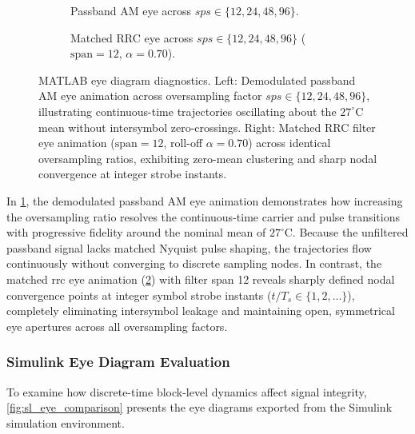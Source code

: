 \documentclass[Markos_Delaportas_1316.tex]{subfiles}
\begin{document}
\begin{figure}[htbp]
    \centering
    \begin{subfigure}{0.48\linewidth}
        \caption{Passband AM eye across $sps \in \{12, 24, 48, 96\}$.}
        \label{fig:ml_awgn_am_fc_eye}
    \end{subfigure}%
    \hfill
    \begin{subfigure}{0.48\linewidth}
        \caption{Matched RRC eye across $sps \in \{12, 24, 48, 96\}$
        ($\text{span} = 12$, $\alpha = 0.70$).}
        \label{fig:ml_rrc_fc_eye_animated}
    \end{subfigure}
    \caption{MATLAB eye diagram diagnostics. Left: Demodulated
        passband AM eye animation across oversampling factor $sps \in
        \{12, 24, 48, 96\}$, illustrating continuous-time trajectories
        oscillating about the $27^\circ\text{C}$ mean without intersymbol
        zero-crossings. Right: Matched RRC filter eye animation
        ($\text{span} = 12$, roll-off $\alpha = 0.70$) across identical
        oversampling ratios, exhibiting zero-mean clustering and sharp
    nodal convergence at integer strobe instants.}
    \label{fig:ml_eye_comparison}
\end{figure}

In \cref{fig:ml_awgn_am_fc_eye}, the demodulated passband AM eye
animation demonstrates how increasing the oversampling
ratio resolves the continuous-time carrier and pulse transitions with
progressive fidelity around the nominal mean of
$27^\circ\text{C}$. Because the unfiltered passband signal lacks
matched Nyquist pulse shaping, the trajectories flow continuously
without converging to discrete sampling nodes. In contrast, the
matched \gls{rrc} eye animation (\cref{fig:ml_rrc_fc_eye_animated})
with filter span 12 reveals sharply defined nodal convergence points
at integer symbol strobe instants ($t / T_s \in \{1, 2, \dots\}$),
completely eliminating intersymbol leakage and maintaining open,
symmetrical eye apertures across all oversampling factors.

\subsubsection{Simulink Eye Diagram Evaluation}
\label{subsubsec:simulink_eye_diagrams}
To examine how discrete-time block-level dynamics affect signal
integrity, \cref{fig:sl_eye_comparison} presents the eye diagrams
exported from the Simulink simulation environment.
\end{document}
